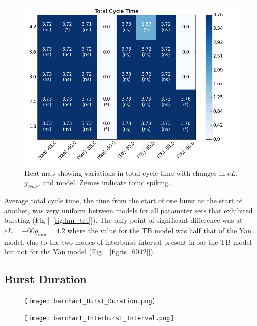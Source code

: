 \documentclass[11pt]{article}
\begin{document}
\begin{figure}
	\centering
	\includegraphics[scale=0.4]{heatmap_Total_Cycle_Time.png}
	\caption{Heat map showing variations in total cycle time with changes in $eL$, $g_{NaP}$, and model. Zeroes indicate tonic spiking.}
	\label{fig:hm tct}

\end{figure}





Average total cycle time, the time from the start of one burst to the start of another, was very uniform between models for all parameter sets that exhibited bursting (Fig [~\ref{fig:hm_tct}]). The only point of significant difference was at $eL=-60 g_{nap} = 4.2$ where the value for the TB model was half that of the Yan model, due to the two modes of interburst interval present in for the TB model but not for the Yan model (Fig [~\ref{fig:ts_6042}]).

\subsection{Burst Duration}



\begin{figure}
	\centering
	\texttt{[image: barchart\_Burst\_Duration.png]}
\end{figure}

  \begin{figure}
	\centering
	\texttt{[image: barchart\_Interburst\_Interval.png]}
\end{figure} 
   
\end{document}
